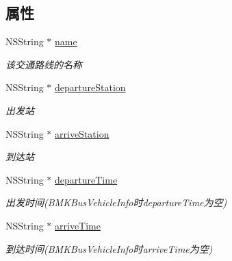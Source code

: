 \subsection*{属性}
\begin{DoxyCompactItemize}
\item 
\hypertarget{interface_b_m_k_base_vehicle_info_abf404d0f9cc8ccb3974a7f930db15893}{}N\+S\+String $\ast$ \hyperlink{interface_b_m_k_base_vehicle_info_abf404d0f9cc8ccb3974a7f930db15893}{name}\label{interface_b_m_k_base_vehicle_info_abf404d0f9cc8ccb3974a7f930db15893}

\begin{DoxyCompactList}\small\item\em 该交通路线的名称 \end{DoxyCompactList}\item 
\hypertarget{interface_b_m_k_base_vehicle_info_ac8d387f3a66b59f3d355ea33bc6a4fb4}{}N\+S\+String $\ast$ \hyperlink{interface_b_m_k_base_vehicle_info_ac8d387f3a66b59f3d355ea33bc6a4fb4}{departure\+Station}\label{interface_b_m_k_base_vehicle_info_ac8d387f3a66b59f3d355ea33bc6a4fb4}

\begin{DoxyCompactList}\small\item\em 出发站 \end{DoxyCompactList}\item 
\hypertarget{interface_b_m_k_base_vehicle_info_a67f395e7136358b2fc8c451017a9d564}{}N\+S\+String $\ast$ \hyperlink{interface_b_m_k_base_vehicle_info_a67f395e7136358b2fc8c451017a9d564}{arrive\+Station}\label{interface_b_m_k_base_vehicle_info_a67f395e7136358b2fc8c451017a9d564}

\begin{DoxyCompactList}\small\item\em 到达站 \end{DoxyCompactList}\item 
\hypertarget{interface_b_m_k_base_vehicle_info_a3d3126cefa3a187f5d2c42cb525b17a1}{}N\+S\+String $\ast$ \hyperlink{interface_b_m_k_base_vehicle_info_a3d3126cefa3a187f5d2c42cb525b17a1}{departure\+Time}\label{interface_b_m_k_base_vehicle_info_a3d3126cefa3a187f5d2c42cb525b17a1}

\begin{DoxyCompactList}\small\item\em 出发时间(B\+M\+K\+Bus\+Vehicle\+Info时departure\+Time为空) \end{DoxyCompactList}\item 
\hypertarget{interface_b_m_k_base_vehicle_info_aa3265dacbed76d29df3c621aa0217b4a}{}N\+S\+String $\ast$ \hyperlink{interface_b_m_k_base_vehicle_info_aa3265dacbed76d29df3c621aa0217b4a}{arrive\+Time}\label{interface_b_m_k_base_vehicle_info_aa3265dacbed76d29df3c621aa0217b4a}

\begin{DoxyCompactList}\small\item\em 到达时间(B\+M\+K\+Bus\+Vehicle\+Info时arrive\+Time为空) \end{DoxyCompactList}\end{DoxyCompactItemize}


